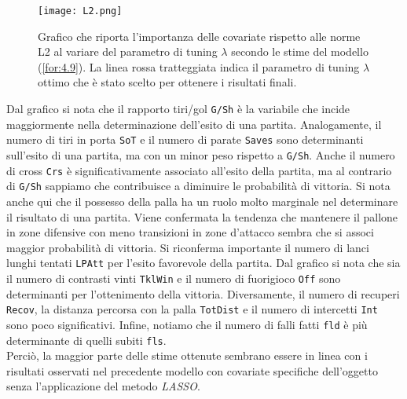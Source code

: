 \begin{figure}[htbp]
	\begin{center}
		\texttt{[image: L2.png]}
		\caption{Grafico che riporta l'importanza delle covariate rispetto alle norme L2 al variare del parametro di tuning $\lambda$ secondo le stime del modello (\ref{for:4.9}). La linea rossa tratteggiata indica il parametro di tuning $\lambda$ ottimo che è stato scelto per ottenere i risultati finali.} \label{fig:l2BTCL}
	\end{center}
\end{figure}
Dal grafico si nota che il rapporto tiri/gol \texttt{G/Sh} è la variabile che incide maggiormente nella determinazione dell'esito di una partita. Analogamente, il numero di tiri in porta \texttt{SoT} e il numero di parate \texttt{Saves} sono determinanti sull'esito di una partita, ma con un minor peso rispetto a \texttt{G/Sh}. Anche il numero di cross \texttt{Crs} è significativamente associato all'esito della partita, ma al contrario di \texttt{G/Sh} sappiamo che contribuisce a diminuire le probabilità di vittoria. Si nota anche qui che il possesso della palla ha un ruolo molto marginale nel determinare il risultato di una partita. Viene confermata la tendenza che mantenere il pallone in zone difensive con meno transizioni in zone d'attacco sembra che si associ maggior probabilità di vittoria. Si riconferma importante il numero di lanci lunghi tentati \texttt{LPAtt} per l'esito favorevole della partita. Dal grafico si nota che sia il numero di contrasti vinti \texttt{TklWin} e il numero di fuorigioco \texttt{Off} sono determinanti per l'ottenimento della vittoria. Diversamente, il numero di recuperi \texttt{Recov}, la distanza percorsa con la palla \texttt{TotDist} e il numero di intercetti \texttt{Int} sono poco significativi. Infine, notiamo che il numero di falli fatti \texttt{fld} è più determinante di quelli subiti \texttt{fls}.\\
Perciò, la maggior parte delle stime ottenute sembrano essere in linea con i risultati osservati nel precedente modello con covariate specifiche dell'oggetto senza l'applicazione del metodo \emph{LASSO}.

